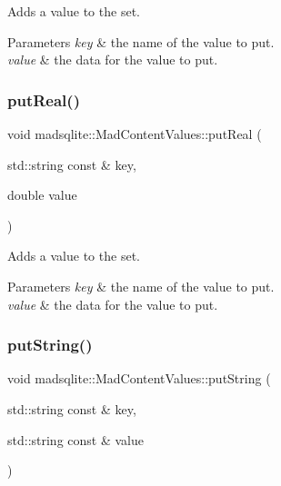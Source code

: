 Adds a value to the set.


\begin{DoxyParams}{Parameters}
{\em key} & the name of the value to put. \\
\hline
{\em value} & the data for the value to put. \\
\hline
\end{DoxyParams}
\hypertarget{classmadsqlite_1_1_mad_content_values_a00a8a96f001511a9201b6b6436ae27b7}{}\label{classmadsqlite_1_1_mad_content_values_a00a8a96f001511a9201b6b6436ae27b7} 
\subsubsection{\texorpdfstring{put\+Real()}{putReal()}}
{\footnotesize\ttfamily void madsqlite\+::\+Mad\+Content\+Values\+::put\+Real (\begin{DoxyParamCaption}\item[{std\+::string const \&}]{key,  }\item[{double}]{value }\end{DoxyParamCaption})}

Adds a value to the set.


\begin{DoxyParams}{Parameters}
{\em key} & the name of the value to put. \\
\hline
{\em value} & the data for the value to put. \\
\hline
\end{DoxyParams}
\hypertarget{classmadsqlite_1_1_mad_content_values_ab00bdb442e3f04ff4e3dc7e04d5b68dd}{}\label{classmadsqlite_1_1_mad_content_values_ab00bdb442e3f04ff4e3dc7e04d5b68dd} 
\subsubsection{\texorpdfstring{put\+String()}{putString()}}
{\footnotesize\ttfamily void madsqlite\+::\+Mad\+Content\+Values\+::put\+String (\begin{DoxyParamCaption}\item[{std\+::string const \&}]{key,  }\item[{std\+::string const \&}]{value }\end{DoxyParamCaption})}


